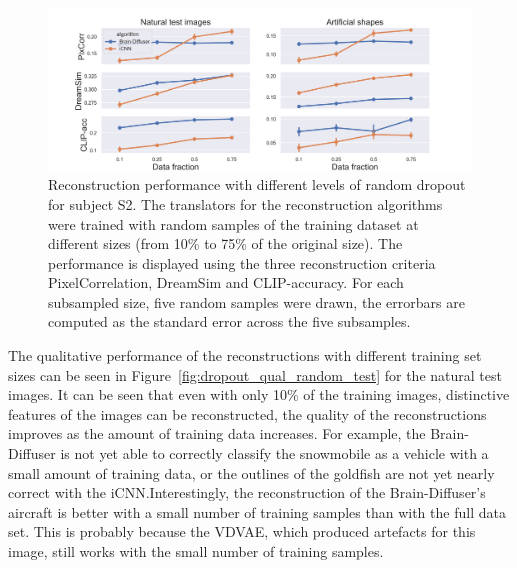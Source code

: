 \begin{figure}[ht]
  \centering
  \includegraphics[width=1\textwidth]{plots/dropout_random_reconstruction.png}
  \caption[Reconstruction Performance with increasing dropout]{Reconstruction performance with different levels of random dropout for subject S2. The translators for the reconstruction algorithms were trained with random samples of the training dataset at different sizes (from 10\% to 75\% of the original size). The performance is displayed using the three reconstruction criteria PixelCorrelation, DreamSim and CLIP-accuracy. For each subsampled size, five random samples were drawn, the errorbars are computed as the standard error across the five subsamples.}\label{fig:dropout_random_reconstruction}
\end{figure}

The qualitative performance of the reconstructions with different training set sizes can be seen in Figure~\ref{fig:dropout_qual_random_test} for the natural test images. It can be seen that even with only 10\% of the training images, distinctive features of the images can be reconstructed,  the quality of the reconstructions improves as the amount of training data increases. For example, the Brain-Diffuser is not yet able to correctly classify the snowmobile as a vehicle with a small amount of training data, or the outlines of the goldfish are not yet nearly correct with the iCNN.\@ Interestingly, the reconstruction of the Brain-Diffuser's aircraft is better with a small number of training samples than with the full data set. This is probably because the VDVAE, which produced artefacts for this image, still works with the small number of training samples. 


